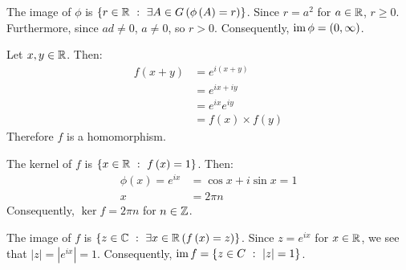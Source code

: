 \documentclass{article}
\begin{document}
The image of $\phi$ is $\left\{r \in \mathbb{R} \ : \  \exists A \in G \left(\phi\left(A\right) = r\right)\right\}$. Since $r = a^2$ for $a \in \mathbb{R}$, $r \geq 0$. Furthermore, since $ad \neq 0$, $a \neq 0$, so $r > 0$. Consequently, $\operatorname{im}\phi = \left(0, \infty\right)$.

\clearpage


Let $x, y \in \mathbb{R}$. Then:
\begin{equation}
    \begin{split}
        f\left(x + y\right) & = e^{i\left(x + y\right)} \\
        & = e^{ix + iy} \\
        & = e^{ix}e^{iy} \\
        & = f\left(x\right) \times f\left(y\right)
    \end{split}
\end{equation}
Therefore $f$ is a homomorphism.

The kernel of $f$ is $\left\{x \in \mathbb{R} \ : \  f\left(x\right) = 1\right\}$. Then:
\begin{equation}
    \begin{split}
        \phi\left(x\right) = e^{ix} & = \cos x + i\sin x = 1 \\
        x & = 2\pi n
    \end{split}
\end{equation}
Consequently, $\ker f = 2\pi n$ for $n \in \mathbb{Z}$.

The image of $f$ is $\left\{z \in \mathbb{C} \ : \  \exists x \in \mathbb{R} \left(f\left(x\right) = z\right)\right\}$. Since $z = e^{ix}$ for $x \in \mathbb{R}$, we see that $|z| = |e^{ix}| = 1$. Consequently, $\operatorname{im} f = \left\{z \in C \ : \  |z| = 1\right\}$.
\end{document}
